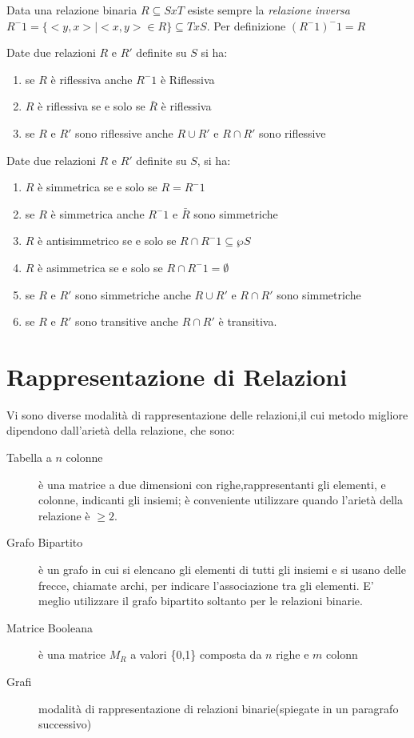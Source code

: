 Data una relazione binaria $R \subseteq S x T$ esiste sempre la \emph{relazione inversa}
$R^-1 = \{<y,x> | <x,y> \in R\} \subseteq T x S$.
Per definizione $(R ^ -1) ^ -1 = R$

\begin{defi}
Date due relazioni $R$ e $R'$ definite su $S$ si ha:
\begin{enumerate}
    \item se $R$ è riflessiva anche $R^-1$ è Riflessiva
    \item $R$ è riflessiva se e solo se $\bar{R}$ è riflessiva
    \item se $R$ e $R'$ sono riflessive anche $R \cup R'$ e $R \cap R'$ sono riflessive
\end{enumerate}
\end{defi}

\begin{defi}
Date due relazioni $R$ e $R'$ definite su $S$, si ha:
\begin{enumerate}
    \item $R$ è simmetrica se e solo se $R = R^-1$
    \item se $R$ è simmetrica anche $R^-1$ e $\bar{R}$ sono simmetriche
    \item $R$ è antisimmetrico se e solo se $R \cap R^-1 \subseteq \wp S$
    \item $R$ è asimmetrica se e solo se $R \cap R^-1 = \emptyset$
    \item se $R$ e $R'$ sono simmetriche anche $R \cup R'$ e $R \cap R'$ sono simmetriche
    \item se $R$ e $R'$ sono transitive anche $R \cap R'$ è transitiva.
\end{enumerate}
\end{defi}

\section{Rappresentazione di Relazioni}
Vi sono diverse modalità di rappresentazione delle relazioni,il cui metodo migliore
dipendono dall'arietà della relazione, che sono:
\begin{description}
    \item[Tabella a $n$ colonne] è una matrice a due dimensioni con righe,rappresentanti
          gli elementi, e colonne, indicanti gli insiemi; è conveniente utilizzare
          quando l'arietà della relazione è $\geq 2$.
    \item[Grafo Bipartito] è un grafo in cui si elencano gli elementi di tutti gli insiemi
         e si usano delle frecce, chiamate archi, per indicare l'associazione tra gli elementi.
         E' meglio utilizzare il grafo bipartito soltanto per le relazioni binarie.
    \item[Matrice Booleana] è una matrice $M_R$ a valori \{0,1\} composta da $n$ righe e $m$ colonn
    \item[Grafi] modalità di rappresentazione di relazioni binarie(spiegate in un paragrafo successivo)
\end{description}

